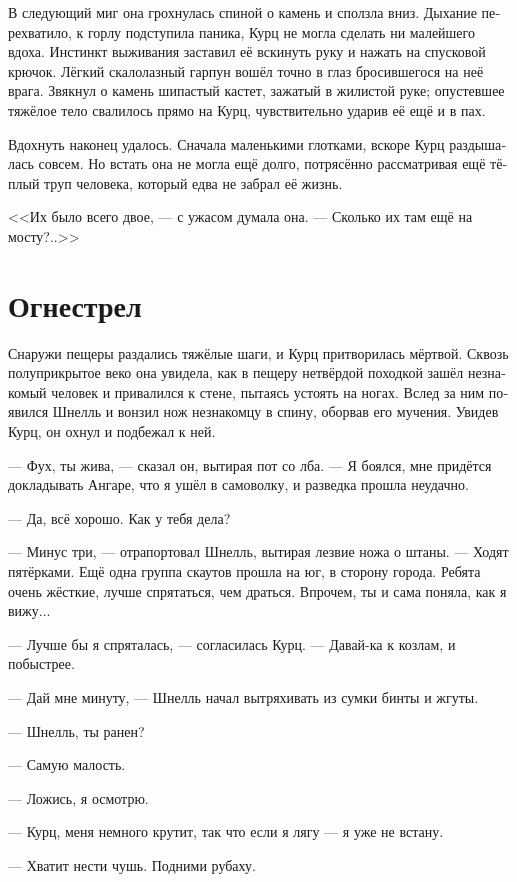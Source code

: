 \documentclass[a4paper,10pt,fleqn]{book}\usepackage{polyglossia}\setdefaultlanguage[babelshorthands=true]{russian}\setotherlanguage{english}\defaultfontfeatures{Ligatures=TeX,Mapping=tex-text}\usepackage{xcolor}\newcommand{\ml}[3]{#2}
\begin{document}
В следующий миг она грохнулась спиной о камень и сползла вниз.
Дыхание перехватило, к горлу подступила паника, Курц не могла сделать ни малейшего вдоха.
Инстинкт выживания заставил её вскинуть руку и нажать на спусковой крючок.
Лёгкий скалолазный гарпун вошёл точно в глаз бросившегося на неё врага.
Звякнул о камень шипастый кастет, зажатый в жилистой руке;
опустевшее тяжёлое тело свалилось прямо на Курц, чувствительно ударив её ещё и в пах.

Вдохнуть наконец удалось.
Сначала маленькими глотками, вскоре Курц раздышалась совсем.
Но встать она не могла ещё долго, потрясённо рассматривая ещё тёплый труп человека, который едва не забрал её жизнь.

<<Их было всего двое, --- с ужасом думала она.
--- Сколько их там ещё на мосту?..>>

\section{Огнестрел}

Снаружи пещеры раздались тяжёлые шаги, и Курц притворилась мёртвой.
Сквозь полуприкрытое веко она увидела, как в пещеру нетвёрдой походкой зашёл незнакомый человек и привалился к стене, пытаясь устоять на ногах.
Вслед за ним появился Шнелль и вонзил нож незнакомцу в спину, оборвав его мучения.
Увидев Курц, он охнул и подбежал к ней.

--- Фух, ты жива, --- сказал он, вытирая пот со лба.
--- Я боялся, мне придётся докладывать Ангаре, что я ушёл в самоволку, и разведка прошла неудачно.

--- Да, всё хорошо.
Как у тебя дела?

--- Минус три, --- отрапортовал Шнелль, вытирая лезвие ножа о штаны.
--- Ходят пятёрками.
Ещё одна группа скаутов прошла на юг, в сторону города.
Ребята очень жёсткие, лучше спрятаться, чем драться.
Впрочем, ты и сама поняла, как я вижу...

--- Лучше бы я спряталась, --- согласилась Курц.
--- Давай-ка к козлам, и побыстрее.

--- Дай мне минуту, --- Шнелль начал вытряхивать из сумки бинты и жгуты.

--- Шнелль, ты ранен?

--- Самую малость.

--- Ложись, я осмотрю.

--- Курц, меня немного крутит, так что если я лягу --- я уже не встану.

--- Хватит нести чушь.
Подними рубаху.
\end{document}
